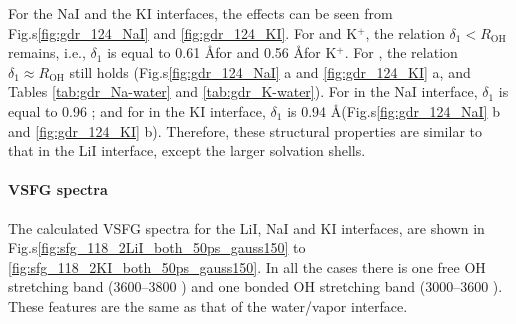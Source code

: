 For the NaI and the KI interfaces, the effects can be seen from Fig.s\thinspace\ref{fig:gdr_124_NaI} and \ref{fig:gdr_124_KI}. For \Na and K$^+$, 
the relation $\delta_1 < R_{\text{OH}}$ remains,
i.e., $\delta_1$ is equal to 0.61 \AA for \Na and 0.56 \AA  for K$^+$.
For \I, the relation $\delta_1 \approx R_{\text{OH}}$ still holds (Fig.s\thinspace\ref{fig:gdr_124_NaI} a and \ref{fig:gdr_124_KI} a,
and Tables \ref{tab:gdr_Na-water} and \ref{tab:gdr_K-water}). For \I in the NaI interface, $\delta_1$ is equal to 0.96 \A; 
and for \I in the KI interface, $\delta_1$ is 0.94 \AA (Fig.s\thinspace\ref{fig:gdr_124_NaI} b and \ref{fig:gdr_124_KI} b).
Therefore, these structural properties are similar to that in the LiI interface, except the larger solvation shells.

\paragraph{VSFG spectra}
The calculated VSFG spectra for the LiI, NaI and KI interfaces, are shown in Fig.s\thinspace\ref{fig:sfg_118_2LiI_both_50ps_gauss150} to \ref{fig:sfg_118_2KI_both_50ps_gauss150}. 
In all the cases there is one free OH stretching band (3600--3800 \centimeter) and one bonded OH stretching band (3000--3600 \centimeter).
These features are the same as that of the water/vapor interface.
